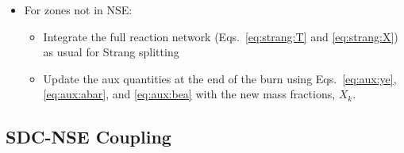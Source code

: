 \documentclass[times,modern]{aastex63}
\begin{document}
\begin{itemize}
\begin{itemize}
\begin{itemize}
      \end{itemize}

      \item For zones not in NSE:

    \begin{itemize}
    \item Integrate the full reaction network (Eqs.~\ref{eq:strang:T} and \ref{eq:strang:X}) as usual for Strang splitting
    \item Update the aux quantities at the end of the burn using Eqs.~\ref{eq:aux:ye}, \ref{eq:aux:abar}, and \ref{eq:aux:bea} with the new mass fractions, $X_k$.
    \end{itemize}
  \end{itemize}
\end{itemize}

\subsection{SDC-NSE Coupling}
\end{document}
